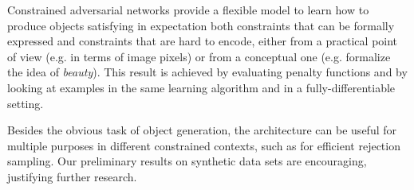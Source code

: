 Constrained adversarial networks provide a flexible model to learn how to produce objects satisfying in expectation both constraints that can be formally expressed and constraints that are hard to encode, either from a practical point of view (e.g. in terms of image pixels) or from a conceptual one (e.g. formalize the idea of \textit{beauty}). This result is achieved by evaluating penalty functions and by looking at examples in the same learning algorithm and in a fully-differentiable setting.

Besides the obvious task of object generation, the architecture can be useful for multiple purposes in different constrained contexts, such as for efficient rejection sampling. Our preliminary results on synthetic data sets are encouraging, justifying further research.
